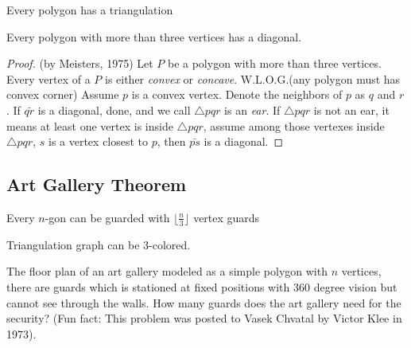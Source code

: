 				\begin{figure}[h!]
					\centering
				\end{figure}

				\begin{theorem}
					Every polygon has a triangulation				
				\end{theorem}

				\begin{lemma}
					Every polygon with more than three vertices has a diagonal.
				\end{lemma}

				\begin{proof}
					(by Meisters, 1975) Let $P$ be a polygon with more than three vertices. Every vertex of a $P$ is either \textit{convex} or \textit{concave}. W.L.O.G.(any polygon must has convex corner) Assume $p$ is a convex vertex. Denote the neighbors of $p$ as $q$ and $r$. If $\bar{qr}$ is a diagonal, done, and we call $\triangle{pqr}$ is an \textit{ear}. If $\triangle{pqr}$ is not an ear, it means at least one vertex is inside $\triangle{pqr}$, assume among those vertexes inside $\triangle{pqr}$, $s$ is a vertex closest to $p$, then $\bar{ps}$ is a diagonal.
				\end{proof}

			\subsection{Art Gallery Theorem}
				\begin{theorem}
					Every $n$-gon can be guarded with $\lfloor \frac{n}{3} \rfloor$ vertex guards
				\end{theorem}

				\begin{lemma}
					Triangulation graph can be 3-colored.
				\end{lemma}

				\begin{problem}
					The floor plan of an art gallery modeled as a simple polygon with $n$ vertices, there are guards which is stationed at fixed positions with 360 degree vision but cannot see through the walls. How many guards does the art gallery need for the security? (Fun fact: This problem was posted to Vasek Chvatal by Victor Klee in 1973).				
				\end{problem}

